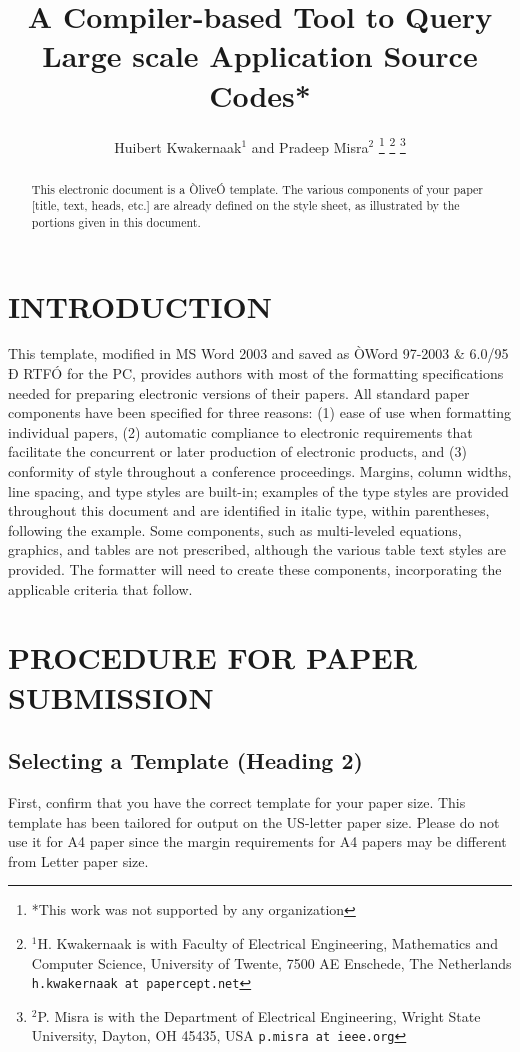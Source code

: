 \documentclass[letterpaper, 10 pt, conference]{ieeeconf}  %
\title{\LARGE \bf
A Compiler-based Tool to Query Large scale Application Source Codes*
}
\author{Huibert Kwakernaak$^{1}$ and Pradeep Misra$^{2}$%
\thanks{*This work was not supported by any organization}%
\thanks{$^{1}$H. Kwakernaak is with Faculty of Electrical Engineering, Mathematics and Computer Science,
        University of Twente, 7500 AE Enschede, The Netherlands
        {\tt\small h.kwakernaak at papercept.net}}%
\thanks{$^{2}$P. Misra is with the Department of Electrical Engineering, Wright State University,
        Dayton, OH 45435, USA
        {\tt\small p.misra at ieee.org}}%
}
\begin{document}
\maketitle
\thispagestyle{empty}
\pagestyle{empty}


\begin{abstract}

This electronic document is a ÒliveÓ template. The various components of your paper [title, text, heads, etc.] are already defined on the style sheet, as illustrated by the portions given in this document.

\end{abstract}


\section{INTRODUCTION}

This template, modified in MS Word 2003 and saved as ÒWord 97-2003 \& 6.0/95 Ð RTFÓ for the PC, provides authors with most of the formatting specifications needed for preparing electronic versions of their papers. All standard paper components have been specified for three reasons: (1) ease of use when formatting individual papers, (2) automatic compliance to electronic requirements that facilitate the concurrent or later production of electronic products, and (3) conformity of style throughout a conference proceedings. Margins, column widths, line spacing, and type styles are built-in; examples of the type styles are provided throughout this document and are identified in italic type, within parentheses, following the example. Some components, such as multi-leveled equations, graphics, and tables are not prescribed, although the various table text styles are provided. The formatter will need to create these components, incorporating the applicable criteria that follow.

\section{PROCEDURE FOR PAPER SUBMISSION}

\subsection{Selecting a Template (Heading 2)}

First, confirm that you have the correct template for your paper size. This template has been tailored for output on the US-letter paper size. Please do not use it for A4 paper since the margin requirements for A4 papers may be different from Letter paper size.
\end{document}
